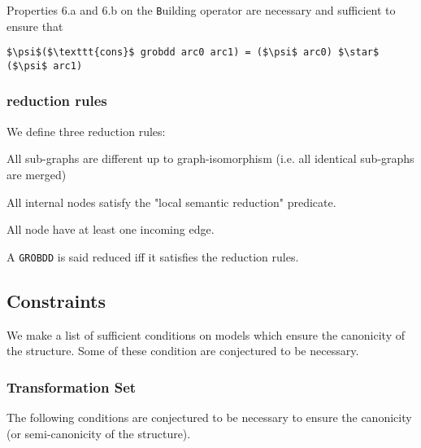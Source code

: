 \documentclass[a4paper,10pt]{article}
\newcommand{\GroBdd}{\texttt{GROBDD}}
\begin{document}
Properties 6.a and 6.b on the \texttt{B}uilding operator are necessary and sufficient to ensure that
\begin{lstlisting}
$\psi$($\texttt{cons}$ grobdd arc0 arc1) = ($\psi$ arc0) $\star$ ($\psi$ arc1)
\end{lstlisting}

\subsubsection{reduction rules}

We define three reduction rules: \begin{compactenum}
\item All sub-graphs are different up to graph-isomorphism (i.e. all identical sub-graphs are merged)
\item All internal nodes satisfy the "local semantic reduction" predicate.
\item All node have at least one incoming edge.
\end{compactenum}
A \GroBdd{} is said reduced iff it satisfies the reduction rules.

\subsection{Constraints}
We make a list of sufficient conditions on models which ensure the canonicity of the structure.
Some of these condition are conjectured to be necessary.
\subsubsection{Transformation Set}

The following conditions are conjectured to be necessary to ensure the canonicity (or semi-canonicity of the structure).
\end{document}
